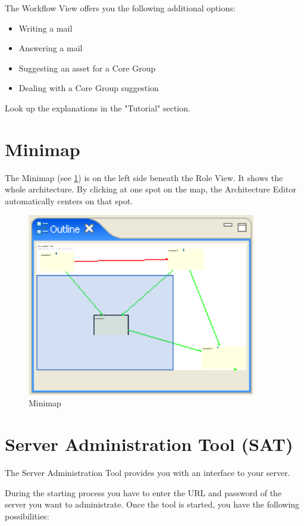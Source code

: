The Workflow View offers you the following additional options:
\begin{itemize}
	\item Writing a mail
	\item Answering a mail
	\item Suggesting an asset for a Core Group
	\item Dealing with a Core Group suggestion
\end{itemize}
Look up the explanations in the "Tutorial" section.

\section{Minimap}

The Minimap (see \ref{map}) is on the left side beneath the Role View. It shows the whole architecture.
By clicking at one spot on the map, the Architecture Editor automatically centers on that
spot. 

\begin{figure}[h!]
\begin{center}
\includegraphics[width=10cm]{outline.png}
   \caption{Minimap}
\label{map}
\end{center}
\end{figure}\par


\section{Server Administration Tool (SAT)}

The Server Administration Tool provides you with an interface to your server. \par
During the starting process you have to enter the URL and password of the server 
you want to administrate. Once the tool is started, you have the following 
possibilities:

